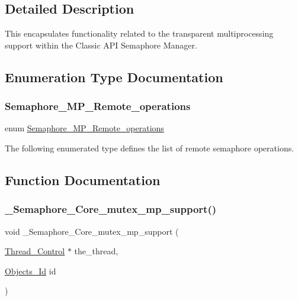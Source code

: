 \subsection{Detailed Description}
This encapsulates functionality related to the transparent multiprocessing support within the Classic A\+PI Semaphore Manager. 

\subsection{Enumeration Type Documentation}
\mbox{\label{group__ClassicSEM_ga24fc0fecc46118303c1de1742a2c5adf}} 
\subsubsection{\texorpdfstring{Semaphore\_MP\_Remote\_operations}{Semaphore\_MP\_Remote\_operations}}
{\footnotesize\ttfamily enum \mbox{\hyperlink{group__ClassicSEM_ga24fc0fecc46118303c1de1742a2c5adf}{Semaphore\+\_\+\+M\+P\+\_\+\+Remote\+\_\+operations}}}

The following enumerated type defines the list of remote semaphore operations. 

\subsection{Function Documentation}
\mbox{\label{group__ClassicSEM_ga604f4eeb578725b893398adcaaaed0a1}} 
\subsubsection{\texorpdfstring{\_Semaphore\_Core\_mutex\_mp\_support()}{\_Semaphore\_Core\_mutex\_mp\_support()}}
{\footnotesize\ttfamily void \+\_\+\+Semaphore\+\_\+\+Core\+\_\+mutex\+\_\+mp\+\_\+support (\begin{DoxyParamCaption}\item[{\mbox{\hyperlink{struct__Thread__Control}{Thread\+\_\+\+Control}} $\ast$}]{the\+\_\+thread,  }\item[{\mbox{\hyperlink{group__RTEMSScoreObject_ga5821f52a51072941bdd603e542d0863e}{Objects\+\_\+\+Id}}}]{id }\end{DoxyParamCaption})}



